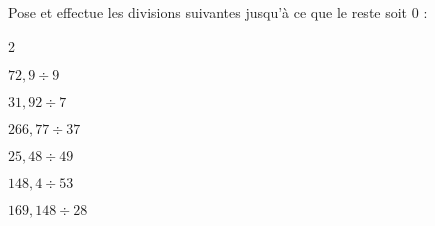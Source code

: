 Pose et effectue les divisions suivantes jusqu'à ce que le reste soit 0 :
\begin{multicols}2
  \begin{myenumerate}
  \item $72,9\div9$
  \item $31,92\div7$
    \item $266,77\div37$
    \item $25,48\div49$
    \item $148,4\div53$
    \item $169,148\div28$
  \end{myenumerate}
\end{multicols}
